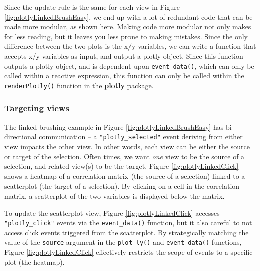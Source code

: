 \documentclass[12pt,]{isuthesis}
\begin{document}
Since the update rule is the same for each view in Figure
\ref{fig:plotlyLinkedBrushEasy}, we end up with a lot of redundant code
that can be made more modular, as shown
\href{https://gist.github.com/cpsievert/6fc17f4dc6d43c88dd214c12bb1a0324}{here}.
Making code more modular not only makes for less reading, but it leaves
you less prone to making mistakes. Since the only difference between the
two plots is the x/y variables, we can write a function that accepts x/y
variables as input, and output a plotly object. Since this function
outputs a plotly object, and is dependent upon \texttt{event\_data()},
which can only be called within a reactive expression, this function can
only be called within the \texttt{renderPlotly()} function in the
\textbf{plotly} package.

\hypertarget{targeting-views}{\subsubsection{Targeting
views}\label{targeting-views}}

The linked brushing example in Figure \ref{fig:plotlyLinkedBrushEasy}
has bi-directional communication -- a \texttt{"plotly\_selected"} event
deriving from either view impacts the other view. In other words, each
view can be either the source or target of the selection. Often times,
we want \emph{one} view to be the source of a selection, and related
view(s) to be the target. Figure \ref{fig:plotlyLinkedClick} shows a
heatmap of a correlation matrix (the source of a selection) linked to a
scatterplot (the target of a selection). By clicking on a cell in the
correlation matrix, a scatterplot of the two variables is displayed
below the matrix.

To update the scatterplot view, Figure \ref{fig:plotlyLinkedClick}
accesses \texttt{"plotly\_click"} events via the \texttt{event\_data()}
function, but it also careful to not access click events triggered from
the scatterplot. By strategically matching the value of the
\texttt{source} argument in the \texttt{plot\_ly()} and
\texttt{event\_data()} functions, Figure \ref{fig:plotlyLinkedClick}
effectively restricts the scope of events to a specific plot (the
heatmap).
\end{document}

